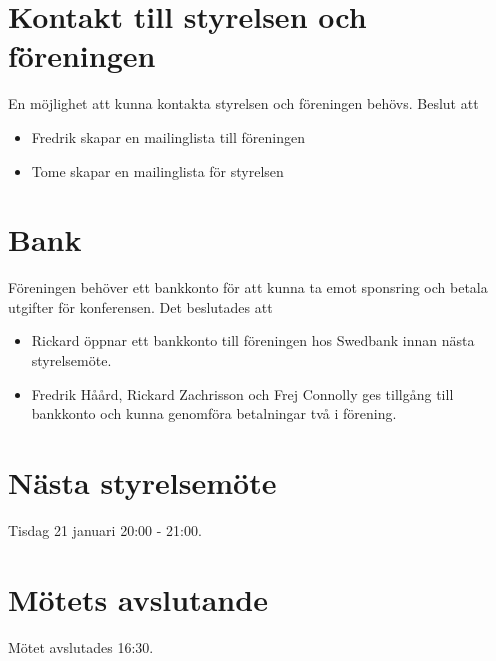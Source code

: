 \documentclass[11pt, a4paper]{article}
\begin{document}
\section{Kontakt till styrelsen och föreningen}
En möjlighet att kunna kontakta styrelsen och föreningen behövs. Beslut att

\begin{itemize}
    \item Fredrik skapar en mailinglista till föreningen
    \item Tome skapar en mailinglista för styrelsen
\end{itemize}

\section{Bank}
Föreningen behöver ett bankkonto för att kunna ta emot sponsring och betala
utgifter för konferensen. Det beslutades att
\begin{itemize}
    \item Rickard öppnar ett bankkonto till föreningen hos Swedbank innan nästa
          styrelsemöte.
    \item Fredrik Håård, Rickard Zachrisson och Frej Connolly ges tillgång till
          bankkonto och kunna genomföra betalningar två i förening.
\end{itemize}

\section{Nästa styrelsemöte}
Tisdag 21 januari 20:00 - 21:00.

\section{Mötets avslutande}
Mötet avslutades 16:30.
\end{document}
